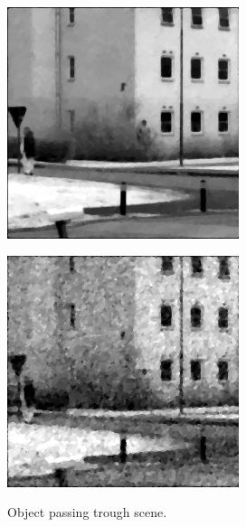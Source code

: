 \begin{figure}[H]
\begin{minipage}[t]{0.32\textwidth}
    \includegraphics[width = \textwidth]{result/dynamic/fly/flyby_1sec_ref.png}
    \label{fig:fly_2}
\end{minipage}
\begin{minipage}[t]{0.32\textwidth}
    \includegraphics[width = \textwidth]{result/dynamic/fly/flyby_1sec_res_psnr_23_snr_18_sssim_58.png}
    \label{fig:fly_3}
\end{minipage}
    \caption{Object passing trough scene.}
    \label{fig:fly_dyn}
\end{figure}

